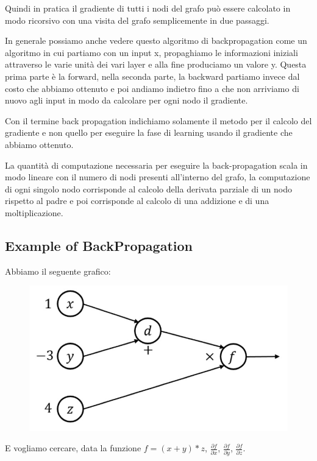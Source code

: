 \documentclass[14pt]{extreport}
\begin{document}
Quindi in pratica il gradiente di tutti i nodi del grafo può essere calcolato in modo ricorsivo con una visita del grafo semplicemente in due
passaggi.

In generale possiamo anche vedere questo algoritmo di backpropagation come un
algoritmo in cui partiamo con un input x, propaghiamo le informazioni iniziali
attraverso le varie unità dei vari layer e alla fine produciamo un valore y.
Questa prima parte è la forward, nella seconda parte, la backward partiamo
invece dal costo che abbiamo ottenuto e poi andiamo indietro fino a che
non arriviamo di nuovo agli input in modo da calcolare per ogni nodo il gradiente. 

Con il termine back propagation indichiamo solamente il metodo per il calcolo del gradiente e non quello per eseguire la fase di learning
usando il gradiente che abbiamo ottenuto.

La quantità di computazione necessaria per eseguire la back-propagation scala in modo lineare con il numero di nodi presenti all'interno del grafo,
la computazione di ogni singolo nodo corrisponde al calcolo della derivata parziale di un nodo rispetto al padre e poi corrisponde al calcolo di una 
addizione e di una moltiplicazione.

\subsection{Example of BackPropagation}

Abbiamo il seguente grafico:

\begin{figure}[H]
\centering
\includegraphics[width=0.5\linewidth]{390.jpeg}
\end{figure}

E vogliamo cercare, data la funzione $f = (x+y)*z$, $\frac{\partial f}{\partial x}$,  $\frac{\partial f}{\partial y}$,  $\frac{\partial f}{\partial
z}$.
\end{document}
